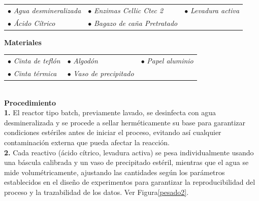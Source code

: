 \documentclass[12pt]{article}
\begin{document}
				\begin{tabular}{p{0.3\textwidth}p{}p{}}	 
					 	 	$\bullet$ \textit{Agua desmineralizada} & $\bullet$ \textit{Enzimas Cellic Ctec 2}  & $\bullet$ \textit{Levadura activa} \\
					 $\bullet$ \textit{Ácido Cítrico} & $\bullet$ \textit{Bagazo de caña Pretratado} & \\
					
					\end{tabular}
					 
					 
					 	\textbf{Materiales} 
					 
					 \begin{tabular}{p{}p{}p{}}
					 $\bullet$ \textit{Cinta de teflón} & $\bullet$ \textit{Algodón } & $\bullet$ \textit{ Papel aluminio} \\
					 	$\bullet$ \textit{Cinta térmica}  & $\bullet$ \textit{Vaso de precipitado} &
					 \end{tabular}
					 \\[0.5em]
					 
					 
					 
					  \textbf{Procedimiento}
					\\[0.5em]	 
		 \textbf{1.}  El reactor tipo batch, previamente lavado, se desinfecta con agua desmineralizada y se procede a sellar herméticamente su base para garantizar condiciones estériles antes de iniciar el proceso, evitando así cualquier contaminación externa que pueda afectar la reacción.\\[0.5em]

		 	
		 \textbf{2.} Cada reactivo (ácido cítrico, levadura activa) se pesa individualmente usando una báscula calibrada y un vaso de precipitado estéril, mientras que el agua se mide volumétricamente, ajustando las cantidades según los parámetros establecidos en el diseño de experimentos para garantizar la reproducibilidad del proceso y la trazabilidad de los datos. Ver Figura\ref{pesado2}.
		 
	
		 
\end{document}
